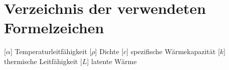 \chapter*{Verzeichnis der verwendeten Formelzeichen}
\begin{acronym}[LabVIEW] %
	[\ensuremath{\alpha}]{ \acrounit{\meter^2\per\second}Temperaturleitfähigkeit}
	[\ensuremath{\rho}]{ Dichte}
	[\ensuremath{c}]{ \acrounit{\joule\per\kilo\gram\per\degreeCelsius}spezifische Wärmekapazität}	
	[\ensuremath{k}]{ \acrounit{\watt\per\meter\per\degreeCelsius}thermische Leitfähigkeit}	
	[\ensuremath{L}]{ \acrounit{\joule\per\kilo\gram}latente Wärme}	
\end{acronym}